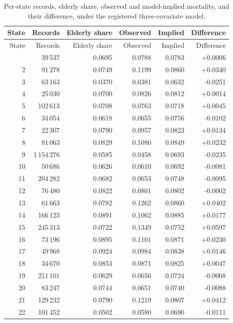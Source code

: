 \documentclass[11pt]{article}
\begin{document}
\begingroup
\singlespacing
\begin{longtable}{rrrrrr}
\caption{Per-state records, elderly share, observed and model-implied
mortality, and their difference, under the registered three-covariate
model.}\\
\toprule
State & Records & Elderly share & Observed & Implied & Difference \\
\midrule
\endfirsthead
\toprule
State & Records & Elderly share & Observed & Implied & Difference \\
\midrule
\endhead
\bottomrule
\endfoot
1 & 39\,537 & 0.0695 & 0.0788 & 0.0783 & +0.0006 \\
2 & 91\,278 & 0.0749 & 0.1199 & 0.0860 & +0.0340 \\
3 & 63\,163 & 0.0370 & 0.0381 & 0.0632 & -0.0251 \\
4 & 25\,030 & 0.0700 & 0.0826 & 0.0812 & +0.0014 \\
5 & 102\,613 & 0.0708 & 0.0763 & 0.0718 & +0.0045 \\
6 & 34\,054 & 0.0618 & 0.0655 & 0.0756 & -0.0102 \\
7 & 22\,307 & 0.0790 & 0.0957 & 0.0823 & +0.0134 \\
8 & 81\,063 & 0.0829 & 0.1080 & 0.0849 & +0.0232 \\
9 & 1\,154\,276 & 0.0585 & 0.0458 & 0.0693 & -0.0235 \\
10 & 50\,686 & 0.0626 & 0.0610 & 0.0692 & -0.0081 \\
11 & 204\,282 & 0.0682 & 0.0653 & 0.0748 & -0.0095 \\
12 & 76\,480 & 0.0822 & 0.0801 & 0.0802 & -0.0002 \\
13 & 61\,663 & 0.0782 & 0.1262 & 0.0860 & +0.0402 \\
14 & 166\,123 & 0.0891 & 0.1062 & 0.0885 & +0.0177 \\
15 & 245\,313 & 0.0722 & 0.1349 & 0.0752 & +0.0597 \\
16 & 73\,196 & 0.0895 & 0.1101 & 0.0871 & +0.0230 \\
17 & 49\,968 & 0.0924 & 0.0984 & 0.0838 & +0.0146 \\
18 & 34\,670 & 0.0853 & 0.0871 & 0.0825 & +0.0047 \\
19 & 211\,101 & 0.0629 & 0.0656 & 0.0724 & -0.0068 \\
20 & 83\,247 & 0.0744 & 0.0651 & 0.0740 & -0.0088 \\
21 & 129\,232 & 0.0790 & 0.1219 & 0.0807 & +0.0412 \\
22 & 101\,452 & 0.0502 & 0.0580 & 0.0690 & -0.0111 \\

\end{longtable}
\end{document}

